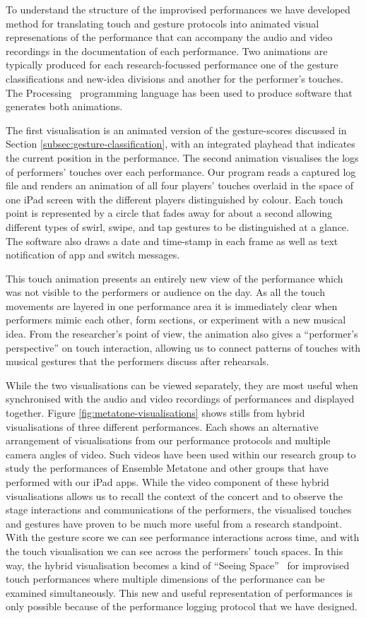 \documentclass[graybox]{svmult}
\begin{document}
To understand the structure of the improvised performances we have
developed method for translating touch and gesture protocols into
animated visual represenations of the performance that can accompany
the audio and video recordings in the documentation of each
performance. Two animations are typically produced for each
research-focussed performance one of the gesture classifications and
new-idea divisions and another for the performer's touches. The
Processing~\cite{Reas:2006kq} programming language has been used to
produce software that generates both animations.

The first visualisation is an animated version of the gesture-scores
discussed in Section \ref{subsec:gesture-classification}, with an
integrated playhead that indicates the current position in the
performance. The second animation visualises the logs of performers'
touches over each performance. Our program reads a captured log file
and renders an animation of all four players' touches overlaid in the
space of one iPad screen with the different players distinguished by
colour. Each touch point is represented by a circle that fades away
for about a second allowing different types of swirl, swipe, and tap
gestures to be distinguished at a glance. The software also draws a
date and time-stamp in each frame as well as text notification of app
and switch messages.

This touch animation presents an entirely new view of the
performance which was not visible to the performers or audience on the
day. As all the touch movements are layered in one performance area it
is immediately clear when performers mimic each other, form sections,
or experiment with a new musical idea. From the researcher's point of
view, the animation also gives a ``performer's perspective'' on touch
interaction, allowing us to connect patterns of touches with musical
gestures that the performers discuss after rehearsals.

While the two visualisations can be viewed separately, they are most
useful when synchronised with the audio and video recordings of
performances and displayed together. Figure
\ref{fig:metatone-visualisations} shows stills from hybrid
visualisations of three different performances. Each shows an
alternative arrangement of visualisations from our performance
protocols and multiple camera angles of video. Such videos have been
used within our research group to study the performances of Ensemble
Metatone and other groups that have performed with our iPad apps.
While the video component of these hybrid visualisations allows us to
recall the context of the concert and to observe the stage
interactions and communications of the performers, the visualised
touches and gestures have proven to be much more useful from a
research standpoint. With the gesture score we can see performance
interactions across time, and with the touch visualisation we can see
across the performers' touch spaces. In this way, the hybrid
visualisation becomes a kind of ``Seeing Space''~\cite{Victor:2014sf}
for improvised touch performances where multiple dimensions of the
performance can be examined simultaneously. This new and useful
representation of performances is only possible because of the
performance logging protocol that we have designed.
\end{document}
